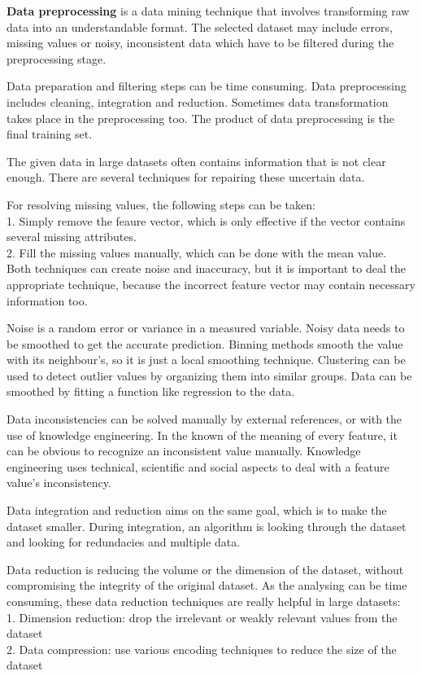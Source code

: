 \textbf{Data preprocessing} \cite{pyle1999data} is a data mining technique that involves transforming raw data into an understandable format. The selected dataset may include errors, missing values or noisy, inconsistent data which have to be filtered during the preprocessing stage. \medskip

Data preparation and filtering steps can be time consuming. Data preprocessing includes cleaning, integration and reduction. Sometimes data transformation takes place in the preprocessing too. The product of data preprocessing is the final training set.\bigskip

The given data in large datasets often contains information that is not clear enough. There are several techniques for repairing these uncertain data. \bigskip

\noindent For resolving missing values, the following steps can be taken:\\
1. Simply remove the feaure vector, which is only effective if the vector contains several missing attributes.\\
2. Fill the missing values manually, which can be done with the mean value.\\
Both techniques can create noise and inaccuracy, but it is important to deal the appropriate technique, because the incorrect feature vector may contain necessary information too. \bigskip


Noise is a random error or variance in a measured variable. Noisy data needs to be smoothed to get the accurate prediction. Binning methods smooth the value with its neighbour's, so it is just a local smoothing technique. Clustering can be used to detect outlier values by organizing them into similar groups. Data can be smoothed by fitting a function like regression to the data.\medskip

Data inconsistencies can be solved manually by external references, or with the use of knowledge engineering. In the known of the meaning of every feature, it can be obvious to recognize an inconsistent value manually. Knowledge engineering uses technical, scientific and social aspects to deal with a feature value's inconsistency.\medskip


Data integration and reduction aims on the same goal, which is to make the dataset smaller. During integration, an algorithm is looking through the dataset and looking for redundacies and multiple data. \medskip

Data reduction is reducing the volume or the dimension of the dataset, without compromising the integrity of the original dataset. As the analysing can be time consuming, these data reduction techniques are really helpful in large datasets:\\
1. Dimension reduction: drop the irrelevant or weakly relevant values from the dataset\\
2. Data compression: use various encoding techniques to reduce the size of the dataset


